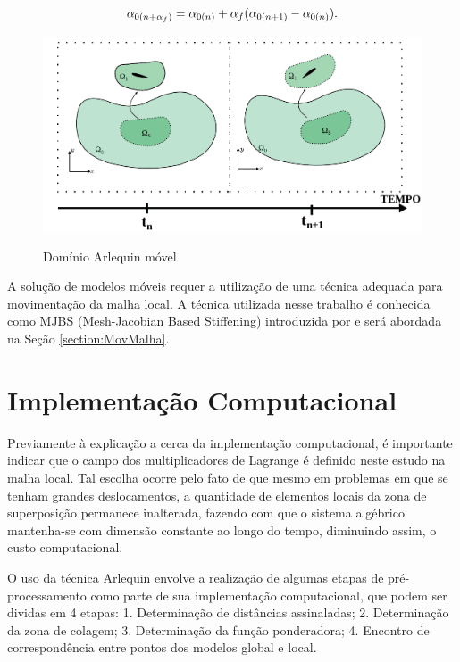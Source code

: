 \documentclass[tese_patricia]{subfiles}
\begin{document}
\begin{align}
	\alpha_{0(n+\alpha_f)} = \alpha_{0(n)} + \alpha_f(\alpha_{0(n+1)} - \alpha_{0(n)}).
\end{align}

\begin{figure}[htb!]
	\centering 
	{\includegraphics[scale=1.0,trim=0cm 0cm 0cm 0cm, clip=true]{Imagens/Cap6/dominioArlequinMoving.pdf}}	
	\caption{Domínio Arlequin móvel}
	\label{fig:ArlquinMóvel}
\end{figure}

A solução de modelos móveis requer a utilização de uma técnica adequada para movimentação da malha local. A técnica utilizada nesse trabalho é conhecida como MJBS (Mesh-Jacobian Based Stiffening) introduzida por  e será abordada na Seção \ref{section:MovMalha}.


\section{Implementação Computacional}


Previamente à explicação a cerca da implementação computacional, é importante indicar que o campo dos multiplicadores de Lagrange é definido neste estudo na malha local. Tal escolha ocorre pelo fato de que mesmo em problemas em que se tenham grandes deslocamentos, a quantidade de elementos locais da zona de superposição permanece inalterada, fazendo com que o sistema algébrico mantenha-se com dimensão constante ao longo do tempo, diminuindo assim, o custo computacional.

O uso da técnica Arlequin envolve a realização de algumas etapas de pré-processamento como parte de sua implementação computacional, que podem ser dividas em 4 etapas: 1. Determinação de distâncias assinaladas; 2. Determinação da zona de colagem;  3. Determinação da função ponderadora; 4. Encontro de correspondência entre pontos dos modelos global e local.
\end{document}
